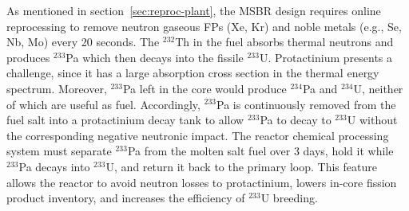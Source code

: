 As mentioned in section~\ref{sec:reproc-plant}, the \gls{MSBR} design 
requires online reprocessing to remove neutron gaseous \glspl{FP} (Xe, Kr) and 
noble metals (e.g., Se, Nb, Mo) every 20 seconds.  The $^{232}$Th in the fuel 
absorbs thermal neutrons and produces $^{233}$Pa which then decays into the 
fissile $^{233}$U. Protactinium presents a challenge, since it has a large 
absorption cross section in the thermal energy spectrum. Moreover, $^{233}$Pa 
left in the core would produce $^{234}$Pa and $^{234}$U, neither of which are 
useful as fuel. Accordingly, $^{233}$Pa is continuously removed from the fuel 
salt into a protactinium decay tank to allow $^{233}$Pa to decay to $^{233}$U 
without the corresponding negative neutronic impact. The reactor chemical 
processing system must separate $^{233}$Pa from the molten salt fuel over 3 
days, hold it while $^{233}$Pa decays into $^{233}$U, and return it back to 
the primary loop. This feature allows the reactor to avoid neutron losses to 
protactinium, lowers in-core fission product inventory, and increases the 
efficiency of $^{233}$U breeding.


